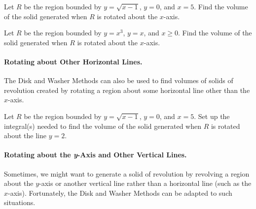 \documentclass[12pt]{article}
\begin{document}
\newpage 



\Example Let $R$ be the region bounded by $y=\sqrt{x-1}$, $y=0$, and $x=5$. Find the volume of the solid generated when $R$ is rotated about the $x$-axis.

\newpage

\Example Let $R$ be the region bounded by $y=x^3$, $y=x$, and $x\geq 0$. Find the volume of the solid generated when $R$ is rotated about the $x$-axis.

\vfill


\newpage

\paragraph{Rotating about Other Horizontal Lines.} The Disk and Washer Methods can also be used to find  volumes of solids of revolution created by rotating a region about some horizontal line other than the $x$-axis.

\Example Let $R$ be the region bounded by $y=\sqrt{x-1}$, $y=0$, and $x=5$. Set up the integral(s) needed to find the volume of the solid generated when $R$ is rotated about the line $y=2$.

\newpage

\paragraph{Rotating about the \textbf{\textit{y}}-Axis and Other Vertical Lines.} Sometimes, we might want to generate a solid of revolution by revolving a region about the $y$-axis or another vertical line rather than a horizontal line (such as the $x$-axis). Fortunately, the Disk and Washer Methods can be adapted to such situations.
\end{document}
